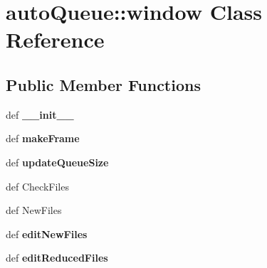\section{auto\-Queue::window Class Reference}
\label{classautoQueue_1_1window}
\subsection*{Public Member Functions}
\begin{CompactItemize}
\item 
def \textbf{\_\-\_\-init\_\-\_\-}\label{classautoQueue_1_1window_f9b1f2279170e293ec3be13e7ec29fca}

\item 
def \textbf{make\-Frame}\label{classautoQueue_1_1window_2129bd61518872f8b89930b33d39aa4a}

\item 
def \textbf{update\-Queue\-Size}\label{classautoQueue_1_1window_4c08934dfe0535b02e6eb8699def7fe2}

\item 
def {\bfauto\-Check\-Files}
\item 
def {\bffind\-New\-Files}
\item 
def \textbf{edit\-New\-Files}\label{classautoQueue_1_1window_41e66e3250f7a972569530201417cca8}

\item 
def \textbf{edit\-Reduced\-Files}\label{classautoQueue_1_1window_c368f76941f17394f7fdd649b48e5611}

\end{CompactItemize}
